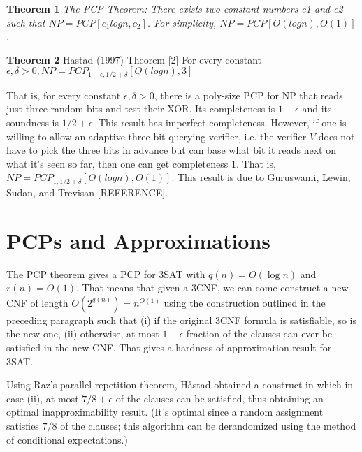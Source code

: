 \textbf{Theorem 1} \textit{The PCP Theorem: There exists two constant numbers c1 and c2 such that $NP = PCP[c_1 log n, c_2]$. For simplicity, $NP = PCP[O(log n), O(1)]$.}

\textbf{Theorem 2} Hastad (1997) Theorem [2] For every constant $\epsilon, \delta > 0, NP = PCP_{1 - \epsilon,1/2+\delta} [O(log n), 3]$ 

That is, for every constant $\epsilon, \delta > 0$, there is a poly-size PCP for NP that reads just three random bits and test their XOR. Its completeness is $1 - \epsilon$ and its soundness is $1/2 + \epsilon$. This result has imperfect completeness. However, if one is willing to allow an adaptive three-bit-querying verifier, i.e. the verifier $V$ does not have to pick the three bits in advance but can base what bit it reads next on what it’s seen so far, then one can get completeness 1. That is, $NP = PCP_{1,1/2+\delta}[O(log n), O(1)]$. This result is due to Guruswami, Lewin,
Sudan, and Trevisan [REFERENCE].

\section{PCPs and Approximations}

The PCP theorem gives a PCP for 3SAT with $q(n) = O(\log n)$ and $r(n) = O(1)$. That means that given a 3CNF, we can come construct a new CNF of length $O(2^{q(n)}) = n^{O(1)}$ using the construction outlined in the preceding paragraph such that (i) if the original 3CNF formula is satisfiable, so is the new one, (ii) otherwise, at most $1-\epsilon$ fraction of the clauses can ever be satisfied in the new CNF. That gives a hardness of approximation result for 3SAT. 

Using Raz's parallel repetition theorem, Håstad obtained a construct in which in case (ii), at most $7/8+\epsilon$ of the clauses can be satisfied, thus obtaining an optimal inapproximability result. (It's optimal since a random assignment satisfies $7/8$ of the clauses; this algorithm can be derandomized using the method of conditional expectations.)

